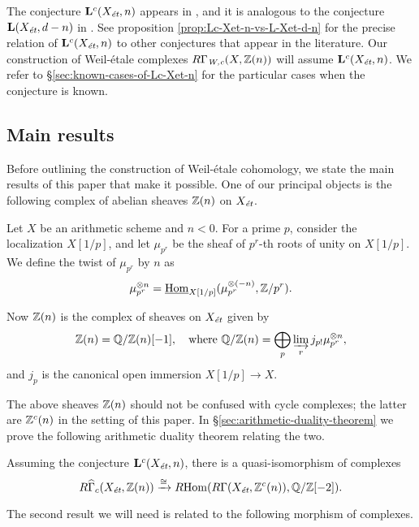 \documentclass{article}
\numberwithin{equation}{section}
\begin{document}
The conjecture $\mathbf{L}^c (X_\et,n)$ appears in
\cite[Definition~5.8]{Morin-2014}, and it is analogous to the conjecture
$\mathbf{L} (X_\et,d-n)$ in \cite[\S 3.2]{Flach-Morin-2018}. See proposition
\ref{prop:Lc-Xet-n-vs-L-Xet-d-n} for the precise relation of
$\mathbf{L}^c (X_\et,n)$ to other conjectures that appear in the literature.
Our construction of Weil-étale complexes $R\Gamma_\Wc (X,\ZZ(n))$ will assume
$\mathbf{L}^c (X_\et,n)$. We refer to \S\ref{sec:known-cases-of-Lc-Xet-n} for
the particular cases when the conjecture is known.

\subsection*{Main results}

Before outlining the construction of Weil-étale cohomology, we state the main
results of this paper that make it possible. One of our principal objects is the
following complex of abelian sheaves $\ZZ (n)$ on $X_\et$.

\begin{definition}
  \label{dfn:sheaf-Z(n)}
  Let $X$ be an arithmetic scheme and $n < 0$. For a prime $p$, consider
  the localization $X [1/p]$, and let $\mu_{p^r}$ be the sheaf of $p^r$-th
  roots of unity on $X [1/p]$. We define the twist of $\mu_{p^r}$ by $n$
  as
  $$\mu_{p^r}^{\otimes n} = \iHom_{X[1/p]} (\mu_{p^r}^{\otimes (-n)}, \ZZ/p^r).$$

  Now $\ZZ (n)$ is the complex of sheaves on $X_\et$ given by
  \[ \ZZ (n) = \QQ/\ZZ (n) [-1],
  \quad \text{where }
  \QQ/\ZZ (n) = \bigoplus_p \varinjlim_r j_{p!} \mu_{p^r}^{\otimes n}, \]
  and $j_p$ is the canonical open immersion $X[1/p] \to X$.
\end{definition}

The above sheaves $\ZZ (n)$ should not be confused with cycle complexes;
the latter are $\ZZ^c (n)$ in the setting of this paper.
In \S\ref{sec:arithmetic-duality-theorem} we prove the following arithmetic
duality theorem relating the two.

\begin{maintheorem}
  \label{theorem-I}
  Assuming the conjecture $\mathbf{L}^c (X_\et,n)$, there is a quasi-isomorphism
  of complexes
  \[ R\widehat{\Gamma}_c (X_\et, \ZZ (n)) \xrightarrow{\cong}
  \RHom (R\Gamma (X_\et, \ZZ^c (n)), \QQ/\ZZ [-2]). \]
\end{maintheorem}

The second result we will need is related to the following morphism of
complexes.
\end{document}
